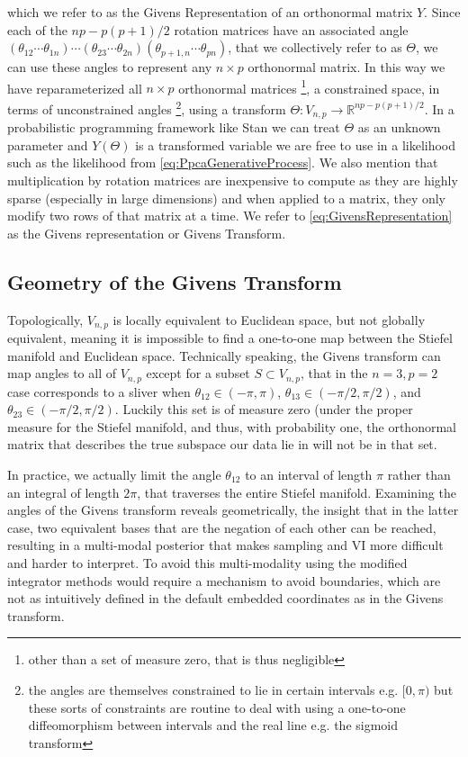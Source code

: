 \documentclass{article}
\begin{document}
which we refer to as the Givens Representation of an orthonormal matrix $Y$. Since each of the $np -p(p+1)/2$ rotation matrices have an associated  angle $(\theta_{12} \cdots \theta_{1n}) \cdots (\theta_{23} \cdots \theta_{2n}) (\theta_{p+1,n} \cdots \theta_{pn})$, that we collectively refer to as $\Theta$, we can use these angles to represent any $n \times p$ orthonormal matrix. In this way we have reparameterized all $n \times p$ orthonormal matrices \footnote{other than a set of measure zero, that is thus negligible}, a constrained space, in terms of unconstrained angles \footnote{the angles are themselves constrained to lie in certain intervals e.g. $[0, \pi)$ but these sorts of constraints are routine to deal with using a one-to-one diffeomorphism between intervals and the real line e.g. the sigmoid transform}, using a transform $\Theta: V_{n,p} \to \mathbb{R}^{np -p(p+1)/2}$. In a probabilistic programming framework like Stan we can treat $\Theta$ as an unknown parameter and $Y(\Theta)$ is a transformed variable we are free to use in a likelihood such as  the likelihood from \ref{eq:PpcaGenerativeProcess}. We also mention that multiplication by rotation matrices are inexpensive to compute as they are highly sparse (especially in large dimensions) and when applied to a matrix, they only modify two rows of that matrix at a time. We refer to \ref{eq:GivensRepresentation} as the Givens representation or Givens Transform.

\subsection{Geometry of the Givens Transform}\label{geomGivens}

Topologically, $V_{n,p}$ is locally equivalent to Euclidean space, but not globally equivalent, meaning it is impossible to find a one-to-one map between the Stiefel manifold and Euclidean space. Technically speaking, the Givens transform can map angles to all of $V_{n,p}$ except for a subset $S \subset V_{n,p}$, that in the $n=3, p=2$ case corresponds to a sliver when $\theta_{12} \in (-\pi, \pi)$, $\theta_{13} \in (-\pi/2, \pi/2)$, and $\theta_{23} \in (-\pi/2, \pi/2)$. Luckily this set is of measure zero (under the proper measure for the Stiefel manifold, and thus, with probability one, the orthonormal matrix that describes the true subspace our data lie in will not be in that set. 

In practice, we actually limit the angle $\theta_{12}$ to an interval of length $\pi$ rather than an integral of length $2\pi$, that traverses the entire Stiefel manifold. Examining the angles of the Givens transform reveals geometrically, the insight that in the latter case, two equivalent bases that are the negation of each other can be reached, resulting in a multi-modal posterior that makes sampling and VI more difficult and harder to interpret. To avoid this multi-modality using the modified integrator methods would require a mechanism to avoid boundaries, which are not as intuitively defined in the default embedded coordinates as in the Givens transform.
\end{document}
